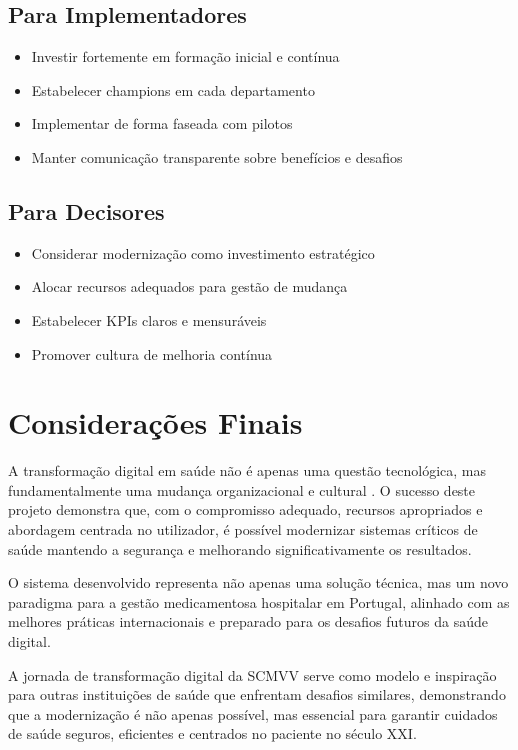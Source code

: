\subsection{Para Implementadores}

\begin{itemize}
    \item Investir fortemente em formação inicial e contínua \cite{kvarnstrom2023}
    \item Estabelecer champions em cada departamento
    \item Implementar de forma faseada com pilotos \cite{vaghasiya2021}
    \item Manter comunicação transparente sobre benefícios e desafios
\end{itemize}

\subsection{Para Decisores}

\begin{itemize}
    \item Considerar modernização como investimento estratégico \cite{lin2018}
    \item Alocar recursos adequados para gestão de mudança \cite{rogers2003}
    \item Estabelecer KPIs claros e mensuráveis \cite{donabedian1988}
    \item Promover cultura de melhoria contínua \cite{may2013}
\end{itemize}

\section{Considerações Finais}

A transformação digital em saúde não é apenas uma questão tecnológica, mas fundamentalmente uma mudança organizacional e cultural \cite{greenhalgh2017}. O sucesso deste projeto demonstra que, com o compromisso adequado, recursos apropriados e abordagem centrada no utilizador, é possível modernizar sistemas críticos de saúde mantendo a segurança e melhorando significativamente os resultados.

O sistema desenvolvido representa não apenas uma solução técnica, mas um novo paradigma para a gestão medicamentosa hospitalar em Portugal, alinhado com as melhores práticas internacionais \cite{who2022} e preparado para os desafios futuros da saúde digital.

A jornada de transformação digital da SCMVV serve como modelo e inspiração para outras instituições de saúde que enfrentam desafios similares, demonstrando que a modernização é não apenas possível, mas essencial para garantir cuidados de saúde seguros, eficientes e centrados no paciente no século XXI. 